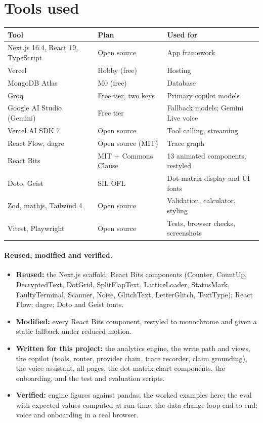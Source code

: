 \documentclass[11pt,a4paper]{article}
\begin{document}
\section{Tools used}\label{sec:tools}
\begin{tabularx}{\linewidth}{@{}p{3.6cm}p{4.2cm}L@{}}
\toprule
\textbf{Tool} & \textbf{Plan} & \textbf{Used for} \\
\midrule
Next.js 16.4, React 19, TypeScript & Open source & App framework~\cite{nextjs} \\
Vercel & Hobby (free) & Hosting~\cite{vercelLimits,vercelPool} \\
MongoDB Atlas & M0 (free) & Database~\cite{atlasM0} \\
Groq & Free tier, two keys & Primary copilot models~\cite{groqLimits} \\
Google AI Studio (Gemini) & Free tier & Fallback models; Gemini Live voice~\cite{geminiRate,geminiLive} \\
Vercel AI SDK 7 & Open source & Tool calling, streaming~\cite{aisdk7} \\
React Flow, dagre & Open source (MIT) & Trace graph~\cite{reactflow} \\
React Bits & MIT + Commons Clause & 13 animated components, restyled~\cite{reactbits} \\
Doto, Geist & SIL OFL & Dot-matrix display and UI fonts~\cite{doto} \\
Zod, mathjs, Tailwind 4 & Open source & Validation, calculator, styling \\
Vitest, Playwright & Open source & Tests, browser checks, screenshots \\
\bottomrule
\end{tabularx}

\paragraph{Reused, modified and verified.}
\begin{itemize}
  \item \textbf{Reused:} the Next.js scaffold; React Bits components (Counter, CountUp, DecryptedText, DotGrid, SplitFlapText, LatticeLoader, StatusMark, FaultyTerminal, Scanner, Noise, GlitchText, LetterGlitch, TextType); React Flow; dagre; Doto and Geist fonts.
  \item \textbf{Modified:} every React Bits component, restyled to monochrome and given a static fallback under reduced motion.
  \item \textbf{Written for this project:} the analytics engine, the write path and views, the copilot (tools, router, provider chain, trace recorder, claim grounding), the voice assistant, all pages, the dot-matrix chart components, the onboarding, and the test and evaluation scripts.
  \item \textbf{Verified:} engine figures against pandas; the worked examples here; the eval with expected values computed at run time; the data-change loop end to end; voice and onboarding in a real browser.
\end{itemize}
\end{document}
